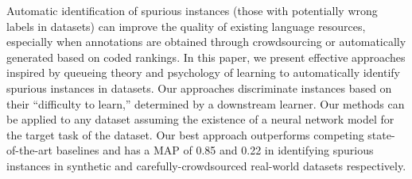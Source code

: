 Automatic identification of spurious instances (those with potentially wrong labels in datasets) can improve the quality of existing language resources, especially when annotations are obtained through crowdsourcing or automatically generated based on coded rankings. In this paper, we present effective approaches inspired by queueing theory and psychology of learning to automatically identify spurious instances in datasets. Our approaches discriminate instances based on their ``difficulty to learn,'' determined by a downstream learner. Our methods can be applied to any dataset assuming the existence of a neural network model for the target task of the dataset. Our best approach outperforms competing state-of-the-art baselines and has a MAP of 0.85 and 0.22 in identifying spurious instances in synthetic and carefully-crowdsourced real-world datasets respectively.
